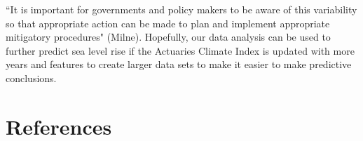 \documentclass[12pt]{report}
\begin{document}
\par \textquotedblleft It is important for governments and policy makers to be aware of this variability so that appropriate action can be made to plan and implement appropriate mitigatory procedures" (Milne). Hopefully, our data analysis can be used to further predict sea level rise if the Actuaries Climate Index is updated with more years and features to create larger data sets to make it easier to make predictive conclusions. 

\newpage 
\section*{References}	
	
	
	
	
	
\end{document}
